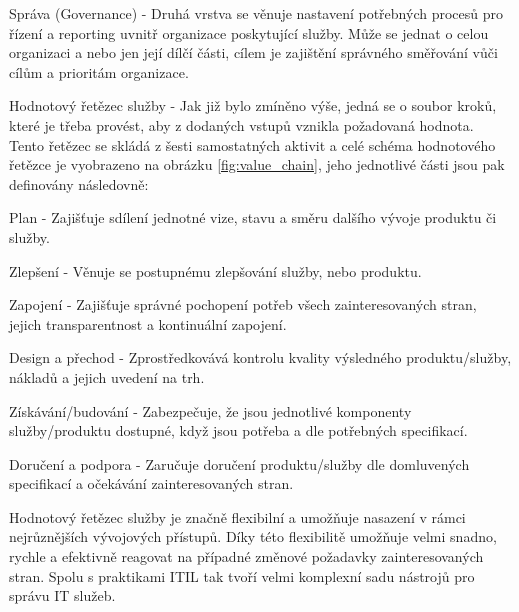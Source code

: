 \documentclass[
  digital,     %
  twoside,     %
  lof,         %
  lot,         %
]{fithesis4}
\begin{document}
\begin{compactitem}
\begin{compactitem}
    \end{compactitem} 
    \item Správa (Governance) - Druhá vrstva se věnuje nastavení potřebných procesů pro řízení a reporting uvnitř organizace poskytující služby. Může se jednat o celou organizaci a nebo jen její dílčí části, cílem je zajištění správného směřování vůči cílům a prioritám organizace. 
    \item Hodnotový řetězec služby - Jak již bylo zmíněno výše, jedná se o soubor kroků, které je třeba provést, aby z dodaných vstupů vznikla požadovaná hodnota. Tento řetězec se skládá z šesti samostatných aktivit a celé schéma hodnotového řetězce je vyobrazeno na obrázku \ref{fig:value_chain}, jeho jednotlivé části jsou pak definovány následovně:
    \begin{compactitem}
        \item Plan - Zajišťuje sdílení jednotné vize, stavu a směru dalšího vývoje produktu či služby.
        \item Zlepšení - Věnuje se postupnému zlepšování služby, nebo produktu.
        \item Zapojení - Zajišťuje správné pochopení potřeb všech zainteresovaných stran, jejich transparentnost a kontinuální zapojení. 
        \item Design a přechod - Zprostředkovává kontrolu kvality výsledného produktu/služby, nákladů a jejich uvedení na trh.
        \item Získávání/budování - Zabezpečuje, že jsou jednotlivé komponenty služby/produktu dostupné, když jsou potřeba a dle potřebných specifikací.
        \item Doručení a podpora - Zaručuje doručení produktu/služby dle domluvených specifikací a očekávání zainteresovaných stran.
    \end{compactitem}
    Hodnotový řetězec služby je značně flexibilní a umožňuje nasazení v rámci nejrůznějších vývojových přístupů. Díky této flexibilitě umožňuje velmi snadno, rychle a efektivně reagovat na případné změnové požadavky zainteresovaných stran. Spolu s praktikami ITIL tak tvoří velmi komplexní sadu nástrojů pro správu IT služeb.\parencite[s.~21]{Cartlidge2020}


\end{compactitem}
\end{document}
